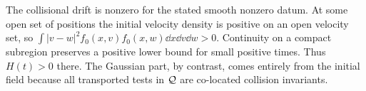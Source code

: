 The collisional drift is nonzero for the stated smooth nonzero datum.
At some open set of positions the initial velocity density is positive
on an open velocity set, so
$\int |v-w|^2f_0(x,v)f_0(x,w)\dd x\dd v\dd w>0$.
Continuity on a compact subregion preserves a positive lower bound for
small positive times. Thus $H(t)>0$ there. The Gaussian part, by contrast,
comes entirely from the initial field because all transported tests in
$\mathcal Q$ are co-located collision invariants.
